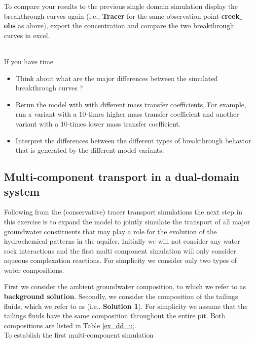 To compare your results to the previous single domain simulation 
display the breakthrough curves again (i.e., {\color{blue}\textbf{Tracer}}
for the same observation point {\color{blue}\textbf{creek$\_$obs}} as above), 
export the concentration and compare the two breakthrough curves in excel. 

\\
If you have time
\begin{itemize}
\item Think about what are the major differences between the simulated 
breakthrough curves ?
\item Rerun the model with with different mass transfer coefficients, 
For example, run a variant with a 10-times higher mass transfer coefficient
and another variant with a 10-times lower mass transfer coefficient. 
\item Interpret the differences between the different types
of breakthrough behavior that is generated by the different model variants.
\end{itemize}

\subsection{Multi-component transport in a dual-domain system}

Following from the (conservative) tracer transport simulations
the next step in this exercise is to expand the model to jointly simulate 
the transport of all major groundwater constituents that may play a role
for the evolution of the hydrochemical patterns in the aquifer.  
Initially we will not consider any water rock interactions and the 
first multi component simulation will only consider aqueous 
complexation reactions. For simplicity we consider only two types 
of water compositions. 

First we consider the ambient groundwater composition, to which we refer 
to as {\color{blue}\textbf{background solution}}. 
Secondly, we consider the composition 
of the tailings fluids, which we refer 
to as (i.e., {\color{blue}\textbf{Solution 1}}).
For simplicity we assume that the tailings fluids have the same composition
throughout the entire pit. Both compositions are listed in Table \ref{ex_dd_u}.
\\
To establish the first multi-component simulation


